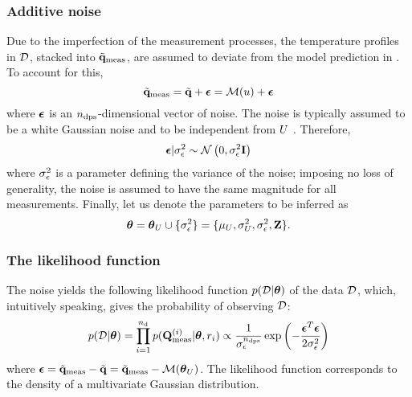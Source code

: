 \subsubsection{Additive noise}
Due to the imperfection of the measurement processes, the temperature profiles in $\mathcal{D}$, stacked into $\tilde{\mathbf{q}}_{\text{meas}}$, are assumed to deviate from the model prediction in . To account for this,
\[
  \mvT_\meas = \mvT + \vnoise = \model{\u} + \vnoise
\]
where $\boldsymbol\epsilon$ is an ${n_\text{dps}}$-dimensional vector of noise. The noise is typically assumed to be a white Gaussian noise and to be independent from $U$ \cite{rasmussen2006}. Therefore,
\[
  \boldsymbol\epsilon | \sigma^2_\epsilon \sim \mathcal{N}\left( 0, \sigma^2_\epsilon \mathbf{I} \right)
\]
where $\sigma^2_\epsilon$ is a parameter defining the variance of the noise; imposing no loss of generality, the noise is assumed to have the same magnitude for all measurements. Finally, let us denote the parameters to be inferred as
\[
  {\boldsymbol\theta} = {\boldsymbol\theta}_U \cup \{ \sigma_\epsilon^2 \} = \{ \mu_U, \sigma_U^2, \sigma_\epsilon^2, \mathbf{Z} \}.
\]

\subsubsection{The likelihood function}
The noise yields the following likelihood function $\f{\data | \vparam}$ of the data $\mathcal{D}$, which, intuitively speaking, gives the probability of observing $\mathcal{D}$:
\begin{equation} \elabel{likelihood}
  \f{\data | \vparam} = \prod_{i = 1}^{\ndata} \f{\mT^{(i)}_\meas| \vparam, \r_i} \propto \frac{1}{\sigma_\noise^\ndcs} \exp\left( -\frac{\vnoise^T \vnoise}{2 \sigma^2_\noise} \right) \nonumber
\end{equation}
where $\vnoise = \mvT_\meas - \mvT = \mvT_\meas - \model{\vparam_\U}$. The likelihood function corresponds to the density of a multivariate Gaussian distribution.

